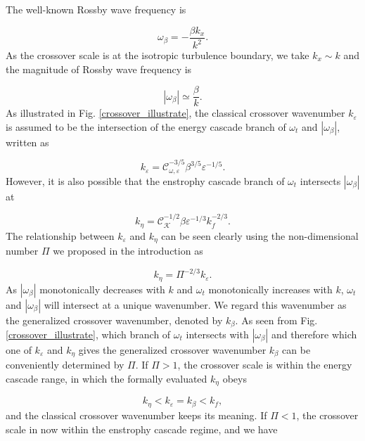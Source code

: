 \documentclass{ametsoc}
\begin{document}
The well-known Rossby wave frequency is 

\begin{equation}
\omega_{\beta}=-\frac{\beta k_{x}}{k^{2}}.\label{eq:Rossby_wave_freq_kx_k}
\end{equation}
As the crossover scale is at the isotropic turbulence boundary, we
take $k_{x}\sim k$ and the magnitude of Rossby wave frequency is

\begin{equation}
|\omega_{\beta}|\simeq\frac{\beta}{k}.\label{eq:Rossby_wave_freq_k}
\end{equation}
As illustrated in Fig. \ref{crossover_illustrate}, the classical
crossover wavenumber $k_{\varepsilon}$ is assumed to be the intersection
of the energy cascade branch of $\omega_{t}$ and $|\omega_{\beta}|$,
written as

\begin{equation}
k_{\varepsilon}=\mathcal{C}_{\omega,\varepsilon}^{-3/5}\beta^{3/5}\varepsilon^{-1/5}.\label{eq:crossover_k_energy_branch}
\end{equation}
However, it is also possible that the enstrophy cascade branch of
$\omega_{t}$ intersects $|\omega_{\beta}|$ at

\begin{equation}
k_{\eta}=\mathcal{C}_{\mathcal{K}}^{-1/2}\beta\varepsilon^{-1/3}k_{f}^{-2/3}.\label{eq:crossover_k_enstrophy_branch}
\end{equation}
The relationship between $k_{\varepsilon}$ and $k_{\eta}$ can be
seen clearly using the non-dimensional number $\Pi$ we proposed in
the introduction as

\begin{equation}
k_{\eta}=\Pi^{-2/3}k_{\varepsilon}.\label{eq:k_eta_k_epsilon_relation}
\end{equation}
As $|\omega_{\beta}|$ monotonically decreases with $k$ and $\omega_{t}$
monotonically increases with $k$, $\omega_{t}$ and $|\omega_{\beta}|$
will intersect at a unique wavenumber. We regard this wavenumber as
the generalized crossover wavenumber, denoted by $k_{\beta}$. As
seen from Fig. \ref{crossover_illustrate}, which branch of $\omega_{t}$
intersects with $|\omega_{\beta}|$ and therefore which one of $k_{\varepsilon}$
and $k_{\eta}$ gives the generalized crossover wavenumber $k_{\beta}$
can be conveniently determined by $\Pi$. If $\Pi>1$, the crossover
scale is within the energy cascade range, in which the formally evaluated
$k_{\eta}$ obeys

\[
k_{\eta}<k_{\varepsilon}=k_{\beta}<k_{f},
\]
and the classical crossover wavenumber keeps its meaning. If $\Pi<1$,
the crossover scale in now within the enstrophy cascade regime, and
we have
\end{document}
